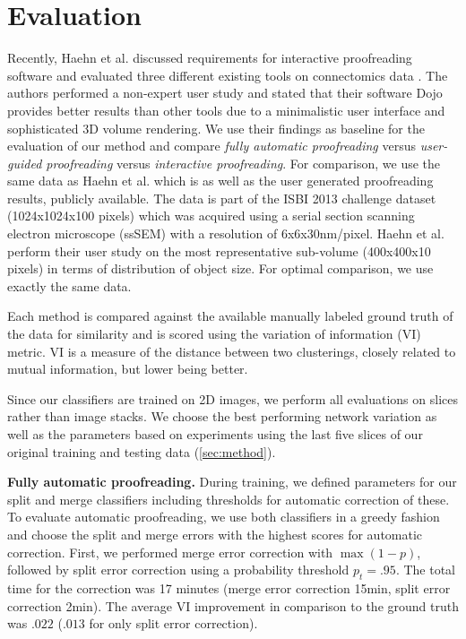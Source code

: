 \section{Evaluation}

Recently, Haehn et al. discussed requirements for interactive proofreading software and evaluated three different existing tools on connectomics data \cite{haehn_dojo_2014}. The authors performed a non-expert user study and stated that their software Dojo provides better results than other tools due to a minimalistic user interface and sophisticated 3D volume rendering. We use their findings as baseline for the evaluation of our method and compare \textit{fully automatic proofreading} versus \textit{user-guided proofreading} versus \textit{interactive proofreading}. For comparison, we use the same data as Haehn et al. which is as well as the user generated proofreading results, publicly available. The data is part of the ISBI 2013 challenge dataset (1024x1024x100 pixels) which was acquired using a serial section scanning electron microscope (ssSEM) with a resolution of 6x6x30nm/pixel. Haehn et al. perform their user study on the most representative sub-volume (400x400x10 pixels) in terms of distribution of object size. For optimal comparison, we use exactly the same data.

Each method is compared against the available manually labeled ground truth of the data for similarity and is scored using the variation of information (VI) metric. VI is a measure of the distance between two clusterings, closely related to mutual information, but lower being better.

Since our classifiers are trained on 2D images, we perform all evaluations on slices rather than image stacks. We choose the best performing network variation as well as the parameters based on experiments using the last five slices of our original training and testing data (\ref{sec:method}). 


\textbf{Fully automatic proofreading.} During training, we defined parameters for our split and merge classifiers including thresholds for automatic correction of these. To evaluate automatic proofreading, we use both classifiers in a greedy fashion and choose the split and merge errors with the highest scores for automatic correction. First, we performed merge error correction with $\max(1-p)$, followed by split error correction using a probability threshold $p_t=.95$. The total time for the correction was 17 minutes (merge error correction 15min, split error correction 2min). The average VI improvement in comparison to the ground truth was $.022$ ($.013$ for only split error correction).

